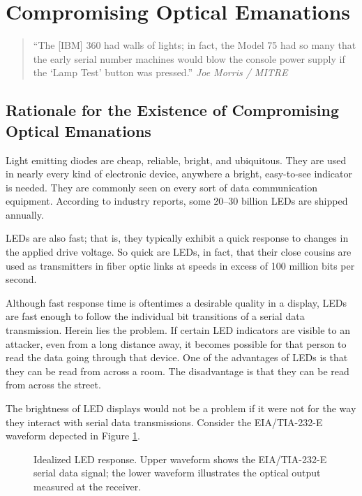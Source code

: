 \documentclass[twocolumn]{article}
\begin{document}
\section{Compromising Optical Emanations}

\begin{quotation}
``The [IBM] 360 had walls of lights; in fact, the Model 75 had so many that the early serial number machines would blow the console power supply if the `Lamp Test' button was pressed.'' {\it Joe Morris / MITRE} \cite{morris}
\end{quotation}

\subsection{Rationale for the Existence of Compromising Optical Emanations}

Light emitting diodes are cheap, reliable, bright, and ubiquitous.  They are used in nearly every kind of electronic device, anywhere a bright, easy-to-see indicator is needed.  They are commonly seen on every sort of data communication equipment.  According to industry reports, some 20--30 billion LEDs are shipped annually. \cite{led_shipments}

LEDs are also fast; that is, they typically exhibit a quick response to changes in the applied drive voltage.  So quick are LEDs, in fact, that their close cousins are used as transmitters in fiber optic links at speeds in excess of 100 million bits per second. \cite{hp_fiber_optic_data_sheet}

Although fast response time is oftentimes a desirable quality in a display, LEDs are fast enough to follow the individual bit transitions of a serial data transmission.  Herein lies the problem.  If certain LED indicators are visible to an attacker, even from a long distance away, it becomes possible for that person to read the data going through that device.  One of the advantages of LEDs is that they can be read from across a room.  The disadvantage is that they can be read from across the street.

The brightness of LED displays would not be a problem if it were not for the way they interact with serial data transmissions.  Consider the EIA/TIA-232-E waveform depected in Figure \ref{idealized_led_response_figure}.

\begin{figure}[htbp]
\centerline{\epsfysize=1.5in }
\caption{Idealized LED response.  Upper waveform shows the EIA/TIA-232-E
serial data signal; the lower waveform illustrates the optical output
measured at the receiver.}
\label{idealized_led_response_figure}
\end{figure}
\end{document}
